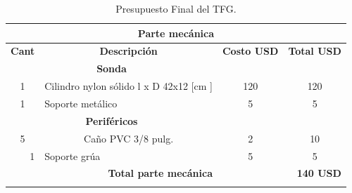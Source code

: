\begin{appendices}
\begin{table}[t]
\protect\caption{Presupuesto Final del TFG.}
     \label{tab:presu}
     \centering
\begin{tabular}{clcc}
\hline
\multicolumn{4}{|c|}{\textbf{Parte mecánica}}                                                                                                                                                         \\ \hline
\multicolumn{1}{|c|}{\textbf{Cant}} & \multicolumn{1}{c|}{\textbf{Descripción}}                               & \multicolumn{1}{c|}{\textbf{Costo USD}} & \multicolumn{1}{c|}{\textbf{Total USD}} \\ \hline
\multicolumn{2}{|c|}{\textbf{Sonda}}                                                                              & \multicolumn{2}{l|}{}                                                             \\ \hline
\multicolumn{1}{|c|}{1}                 & \multicolumn{1}{l|}{Cilindro nylon sólido l x D 42x12 {[}cm {]}}        & \multicolumn{1}{c|}{120}                & \multicolumn{1}{c|}{120}                \\ \hline
\multicolumn{1}{|c|}{1}                 & \multicolumn{1}{l|}{Soporte metálico}                                   & \multicolumn{1}{c|}{5}                  & \multicolumn{1}{c|}{5}                  \\ \hline
\multicolumn{2}{|c|}{\textbf{Periféricos}}                                                                        & \multicolumn{2}{c|}{}                                                             \\ \hline
\multicolumn{1}{c|}{5}                 & \multicolumn{1}{c|}{Caño PVC 3/8 pulg.}                                 & \multicolumn{1}{c|}{2}                  & \multicolumn{1}{c|}{10}                 \\ \hline
\multicolumn{1}{|r|}{1}                 & \multicolumn{1}{l|}{Soporte grúa}                                       & \multicolumn{1}{c|}{5}                  & \multicolumn{1}{c|}{5}                  \\ \hline
\multicolumn{2}{|r|}{\textbf{Total parte mecánica}}                                                               & \multicolumn{2}{r|}{\textbf{140 USD}}                                             \\ \hline
                                        &                                                                         &                                         &                                         \\ \hline

\end{tabular}
\end{table}
\end{appendices}
